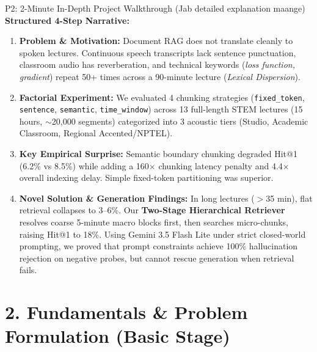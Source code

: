 \documentclass[10pt,a4paper]{article}
\begin{document}
\begin{quesbox}{P2: 2-Minute In-Depth Project Walkthrough (Jab detailed explanation maange)}
\textbf{Structured 4-Step Narrative:}
\begin{enumerate}[leftmargin=*]
    \item \textbf{Problem \& Motivation:} Document RAG does not translate cleanly to spoken lectures. Continuous speech transcripts lack sentence punctuation, classroom audio has reverberation, and technical keywords (\textit{loss function, gradient}) repeat 50+ times across a 90-minute lecture (\textit{Lexical Dispersion}).
    \item \textbf{Factorial Experiment:} We evaluated 4 chunking strategies (\texttt{fixed\_token}, \texttt{sentence}, \texttt{semantic}, \texttt{time\_window}) across 13 full-length STEM lectures (15 hours, $\sim$20,000 segments) categorized into 3 acoustic tiers (Studio, Academic Classroom, Regional Accented/NPTEL).
    \item \textbf{Key Empirical Surprise:} Semantic boundary chunking degraded Hit@1 (6.2\% vs 8.5\%) while adding a 160$\times$ chunking latency penalty and 4.4$\times$ overall indexing delay. Simple fixed-token partitioning was superior.
    \item \textbf{Novel Solution \& Generation Findings:} In long lectures ($>$35 min), flat retrieval collapses to 3--6\%. Our \textbf{Two-Stage Hierarchical Retriever} resolves coarse 5-minute macro blocks first, then searches micro-chunks, raising Hit@1 to 18\%. Using Gemini 3.5 Flash Lite under strict closed-world prompting, we proved that prompt constraints achieve 100\% hallucination rejection on negative probes, but cannot rescue generation when retrieval fails.
\end{enumerate}
\end{quesbox}

\section*{\color{primary} 2. Fundamentals \& Problem Formulation (Basic Stage)}
\end{document}

